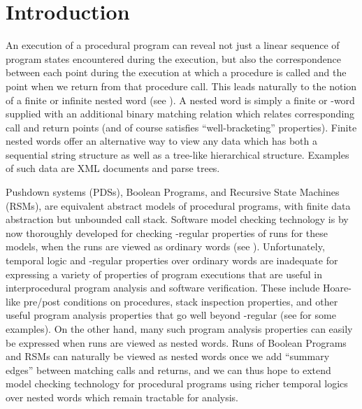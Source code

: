 \documentclass{LMCS}
\theoremstyle{plain}
\theoremstyle{definition}
\newcounter{example}
\begin{document}
\maketitle
\vfill\eject

\section{Introduction} 
\noindent An execution of a procedural program can reveal
not just a linear sequence of program states encountered during the
execution, but also the correspondence between each point during the
execution at which a procedure is called and the point when we return
from that procedure call.  This leads naturally to the notion of a
finite or infinite nested word (see \cite{nested,VPL,AEM04}).  A
nested word is simply a finite or -word supplied with an
additional binary matching relation which relates corresponding call
and return points (and of course satisfies ``well-bracketing''
properties).  Finite nested words offer an alternative way to view any
data which has both a sequential string structure as well as a
tree-like hierarchical structure.  Examples of such data are XML
documents and parse trees.

Pushdown systems (PDSs), Boolean Programs, and Recursive State
Machines (RSMs), are equivalent abstract models of procedural
programs, with finite data abstraction but unbounded call stack.
Software model checking technology is by now thoroughly developed for
checking -regular properties of runs for these models, when
the runs are viewed as ordinary words (see 
\cite{BallRajamani,moped,RSM}).  Unfortunately, temporal logic and
-regular properties over ordinary words are inadequate for
expressing a variety of properties of program executions that are
useful in interprocedural program analysis and software verification.
These include Hoare-like pre/post conditions on procedures, stack
inspection properties, and other useful program analysis properties
that go well beyond -regular (see \cite{AEM04} for some
examples).  On the other hand, many such program analysis properties
can easily be expressed when runs are viewed as nested words.  
Runs of Boolean Programs and RSMs can naturally be viewed as
nested words once we add ``summary edges'' between matching calls and
returns, and we can thus hope to extend model checking technology for
procedural programs using richer temporal logics over nested words
which remain tractable for analysis.
\end{document}
